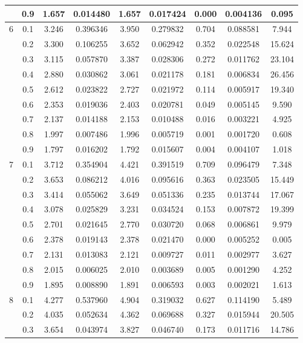 \begin{longtable}{ | c | c || c | c | c | c | c | c | c | }
 & 0.9 & 1.657 & 0.014480 & 1.657 & 0.017424 & 0.000 & 0.004136 & 0.095 \\
 \hline
\multirow{9}{*}{6} & 0.1 & 3.246 & 0.396346 & 3.950 & 0.279832 & 0.704 & 0.088581 & 7.944 \\
 & 0.2 & 3.300 & 0.106255 & 3.652 & 0.062942 & 0.352 & 0.022548 & 15.624 \\
 & 0.3 & 3.115 & 0.057870 & 3.387 & 0.028306 & 0.272 & 0.011762 & 23.104 \\
 & 0.4 & 2.880 & 0.030862 & 3.061 & 0.021178 & 0.181 & 0.006834 & 26.456 \\
 & 0.5 & 2.612 & 0.023822 & 2.727 & 0.021972 & 0.114 & 0.005917 & 19.340 \\
 & 0.6 & 2.353 & 0.019036 & 2.403 & 0.020781 & 0.049 & 0.005145 & 9.590 \\
 & 0.7 & 2.137 & 0.014188 & 2.153 & 0.010488 & 0.016 & 0.003221 & 4.925 \\
 & 0.8 & 1.997 & 0.007486 & 1.996 & 0.005719 & 0.001 & 0.001720 & 0.608 \\
 & 0.9 & 1.797 & 0.016202 & 1.792 & 0.015607 & 0.004 & 0.004107 & 1.018 \\
 \hline
\multirow{9}{*}{7} & 0.1 & 3.712 & 0.354904 & 4.421 & 0.391519 & 0.709 & 0.096479 & 7.348 \\
 & 0.2 & 3.653 & 0.086212 & 4.016 & 0.095616 & 0.363 & 0.023505 & 15.449 \\
 & 0.3 & 3.414 & 0.055062 & 3.649 & 0.051336 & 0.235 & 0.013744 & 17.067 \\
 & 0.4 & 3.078 & 0.025829 & 3.231 & 0.034524 & 0.153 & 0.007872 & 19.399 \\
 & 0.5 & 2.701 & 0.021645 & 2.770 & 0.030720 & 0.068 & 0.006861 & 9.979 \\
 & 0.6 & 2.378 & 0.019143 & 2.378 & 0.021470 & 0.000 & 0.005252 & 0.005 \\
 & 0.7 & 2.131 & 0.013083 & 2.121 & 0.009727 & 0.011 & 0.002977 & 3.627 \\
 & 0.8 & 2.015 & 0.006025 & 2.010 & 0.003689 & 0.005 & 0.001290 & 4.252 \\
 & 0.9 & 1.895 & 0.008890 & 1.891 & 0.006593 & 0.003 & 0.002021 & 1.613 \\
 \hline
\multirow{9}{*}{8} & 0.1 & 4.277 & 0.537960 & 4.904 & 0.319032 & 0.627 & 0.114190 & 5.489 \\
 & 0.2 & 4.035 & 0.052634 & 4.362 & 0.069688 & 0.327 & 0.015944 & 20.505 \\
 & 0.3 & 3.654 & 0.043974 & 3.827 & 0.046740 & 0.173 & 0.011716 & 14.786 \\

\end{longtable}
